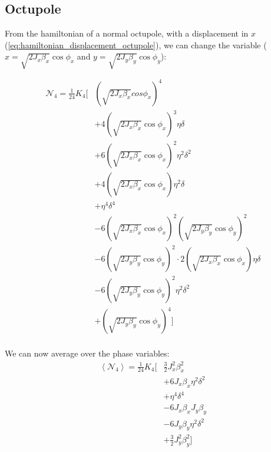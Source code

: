 \newpage

\hypertarget{octupole-2}{%
\subsection{Octupole}\label{octupole-2}}

From the hamiltonian of a normal octupole, with a displacement in \(x\)
(\cref{eq:hamiltonian_displacement_octupole}), we can change the
variable (\(x = \sqrt{2 J_x \beta_x} \cos \phi_x\) and
\(y = \sqrt{2 J_y \beta_y} \cos \phi_y\)):

\begin{equation}
\begin{aligned}
\mathcal{N}_4 = \frac{1}{24} K_4 \biggl[& \left(\sqrt{2J_x\beta_x} cos\phi_x\right)^4 \\
                                        & +4 \left(\sqrt{2 J_x \beta_x} \cos \phi_x\right)^3 \eta \delta \\
                                        & +6 \left(\sqrt{2 J_x \beta_x} \cos \phi_x\right)^2 \eta^2 \delta^2 \\
                                        & +4 \left(\sqrt{2 J_x \beta_x} \cos \phi_x\right) \eta^2 \delta \\
                                        & +\eta^4 \delta^4 \\
                                        & -6 \left(\sqrt{2 J_x \beta_x} \cos \phi_x\right)^2 \left(\sqrt{2 J_y \beta_y}\cos \phi_y\right)^2\\
                                        & -6 \left(\sqrt{2 J_y \beta_y} \cos \phi_y\right)^2 \cdot 2 \left(\sqrt{2 J_x \beta_x}\cos \phi_x\right) \eta \delta \\
                                        & -6 \left(\sqrt{2 J_y \beta_y} \cos \phi_y\right)^2 \eta^2 \delta^2 \\
                                        & + \left(\sqrt{2 J_y \beta_y} \cos \phi_y\right)^4
                                  \biggr]\\
\end{aligned}
\end{equation}

We can now average over the phase variables: \begin{equation}
\begin{aligned}
\left< \mathcal{N}_4 \right> = \frac{1}{24} K_4 \biggl[& \frac{3}{2} J_x^2\beta_x^2 \\
                                                       & +6 J_x \beta_x \eta^2 \delta^2 \\
                                                       & +\eta^4 \delta^4 \\
                                                       & -6 J_x \beta_x J_y \beta_y\\
                                                       & -6 J_y \beta_y \eta^2 \delta^2 \\
                                                       & + \frac{3}{2} J_y^2 \beta_y^2
                                                 \biggr]\\
\end{aligned}
\end{equation}

